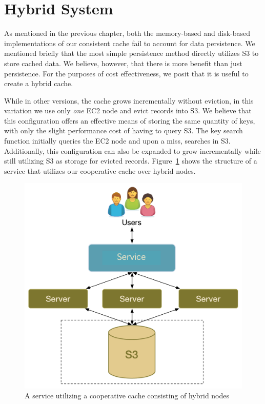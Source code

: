 \section{Hybrid System} %
\label{sec:hybrid_system}
As mentioned in the previous chapter, both the memory-based and disk-based
implementations of our consistent cache fail to account for data persistence.
We mentioned briefly that the most simple persistence method directly utilizes
S3 to store cached data. We believe, however, that there is more benefit than
just persistence. For the purposes of cost effectiveness, we posit that it is
useful to create a hybrid cache.

While in other versions, the cache grows incrementally without eviction, in
this variation we use only \emph{one} EC2 node and evict records into S3. We
believe that this configuration offers an effective means of storing the same
quantity of keys, with only the slight performance cost of having to query S3.
The key search function initially queries the EC2 node and upon a miss,
searches in S3. Additionally, this configuration can also be expanded to grow
incrementally while still utilizing S3 as storage for evicted records.
Figure~\ref{fig:hybrid_setup} shows the structure of a service that utilizes
our cooperative cache over hybrid nodes.

\begin{figure}
\begin{center}
\includegraphics[scale=0.5]{figures/auspice_setup.pdf}
\end{center}
\caption{A service utilizing a cooperative cache consisting of hybrid nodes}
\label{fig:hybrid_setup}
\end{figure}


